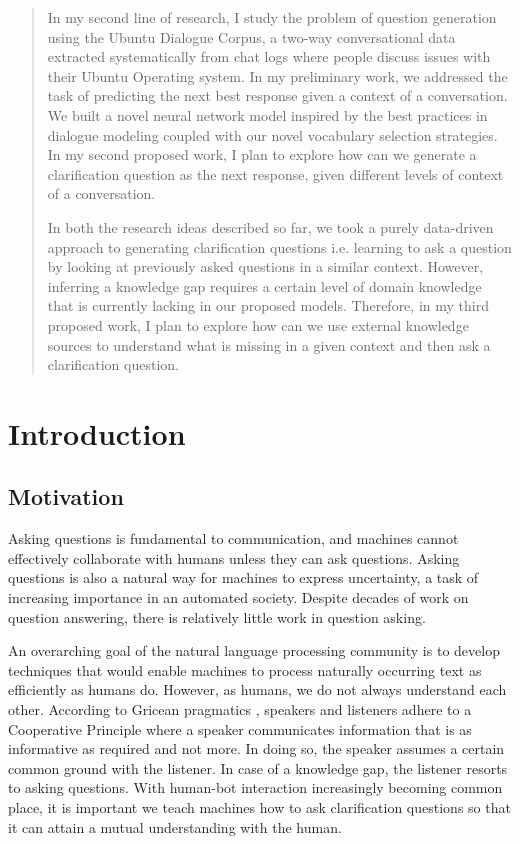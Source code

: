 \documentclass[11pt]{report}
\begin{document}
\begin{abstract}
In my second line of research, I study the problem of question generation using the Ubuntu Dialogue Corpus, a two-way conversational data extracted systematically from chat logs where people discuss issues with their Ubuntu Operating system. In my preliminary work, we addressed the task of predicting the next best response given a context of a conversation. We built a novel neural network model inspired by the best practices in dialogue modeling coupled with our novel vocabulary selection strategies. In my second proposed work, I plan to explore how can we generate a clarification question as the next response, given different levels of context of a conversation. 

In both the research ideas described so far, we took a purely data-driven approach to generating clarification questions i.e. learning to ask a question by looking at previously asked questions in a similar context. However, inferring a knowledge gap requires a certain level of domain knowledge that is currently lacking in our proposed models. Therefore, in my third proposed work, I plan to explore how can we use external knowledge sources to understand what is missing in a given context and then ask a clarification question. 

\end{abstract}

\pagebreak


\tableofcontents
\pagebreak

\cleardoublepage
{}


\chapter{Introduction}

\section{Motivation}

Asking questions is fundamental to communication, and machines cannot effectively collaborate with humans unless they can ask questions. Asking questions is also a natural way for machines to express uncertainty, a task of increasing importance in an automated society. Despite decades of work on question answering, there is relatively little work in question asking.

An overarching goal of the natural language processing community is to develop techniques that would enable machines to process naturally occurring text as efficiently as humans do. However, as humans, we do not always understand each other. According to Gricean pragmatics \cite{grice1975logic}, speakers and listeners adhere to a Cooperative Principle where a speaker communicates information that is as informative as required and not more. In doing so, the speaker assumes a certain common ground with the listener. In case of a knowledge gap, the listener resorts to asking questions. With human-bot interaction increasingly becoming common place, it is important we teach machines how to ask clarification questions so that it can attain a mutual understanding with the human. 
\end{document}
